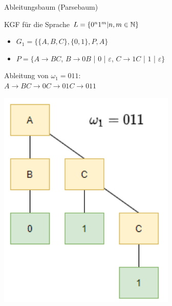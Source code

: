 \begin{minipage}{0.8\linewidth}
    \begin{definition}{Ableitungsbaum (Parsebaum)} 
        
        KGF für die Sprache $L=\{0^{n} 1^{m} | n, m \in \mathbb{N}\}$
        \begin{itemize}
        \item $G_{1}=\{\{A, B, C\},\{0,1\}, P, A\}$
        \item $P=\{A \rightarrow B C$, $B \rightarrow 0 B$ | $0$ | $\varepsilon$, $C \rightarrow 1 C$ | $1$ | $\varepsilon\}$
        \end{itemize}
        Ableitung von $\omega_{1}=011$:\\ $A \rightarrow B C \rightarrow 0 C \rightarrow 01 C \rightarrow 011$
    \end{definition}
\end{minipage}
\begin{minipage}{0.2\linewidth}
    \includegraphics[width=1\linewidth]{ableitungsbaum.png}
\end{minipage}





